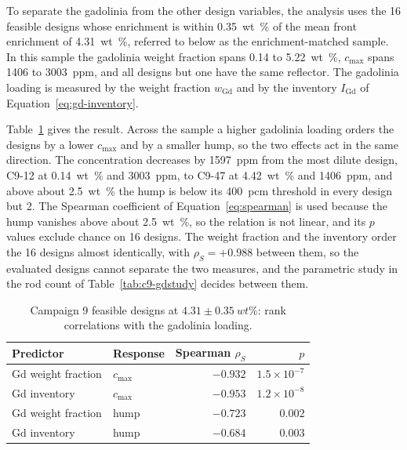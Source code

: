 To separate the gadolinia from the other design variables, the analysis
uses the 16 feasible designs whose enrichment is within
\SI{0.35}{wt\%} of the mean front enrichment of \SI{4.31}{wt\%},
referred to below as the enrichment-matched sample. In this sample the
gadolinia weight fraction spans 0.14 to \SI{5.22}{wt\%},
$c_\mathrm{max}$ spans 1406 to \SI{3003}{ppm}, and all designs but one
have the same reflector. The gadolinia loading is measured by the
weight fraction $w_\mathrm{Gd}$ and by the inventory $I_\mathrm{Gd}$ of
Equation~\eqref{eq:gd-inventory}.

Table~\ref{tab:c9-gd-corr} gives the result. Across the sample a higher
gadolinia loading orders the designs by a lower $c_\mathrm{max}$ and by a
smaller hump, so the two effects act in the same direction. The
concentration decreases by \SI{1597}{ppm} from the most dilute design,
C9-12 at \SI{0.14}{wt\%} and \SI{3003}{ppm}, to C9-47 at
\SI{4.42}{wt\%} and \SI{1406}{ppm}, and above about \SI{2.5}{wt\%} the
hump is below its \SI{400}{pcm} threshold in every design but 2. The
Spearman coefficient of Equation~\eqref{eq:spearman} is used because
the hump vanishes above about \SI{2.5}{wt\%}, so the relation is not
linear, and its $p$ values exclude chance on 16 designs. The weight
fraction and the inventory order the 16 designs almost identically,
with $\rho_S = +0.988$ between them, so the evaluated designs cannot
separate the two measures, and the parametric study in the rod count
of Table~\ref{tab:c9-gdstudy} decides between them.

\begin{table}[htbp]
  \centering
  \caption{Campaign 9 feasible designs at $4.31 \pm \SI{0.35}{wt\%}$: rank correlations with the gadolinia loading.}
  \label{tab:c9-gd-corr}
  \small
  \begin{tabular}{@{}llrr@{}}
    \toprule
    Predictor & Response & Spearman $\rho_S$ & $p$ \\
    \midrule
    Gd weight fraction & $c_\mathrm{max}$ & $-0.932$ & $1.5\times10^{-7}$ \\
    Gd inventory       & $c_\mathrm{max}$ & $-0.953$ & $1.2\times10^{-8}$ \\
    Gd weight fraction & hump             & $-0.723$ & $0.002$ \\
    Gd inventory       & hump             & $-0.684$ & $0.003$ \\
    \bottomrule
  \end{tabular}
\end{table}

